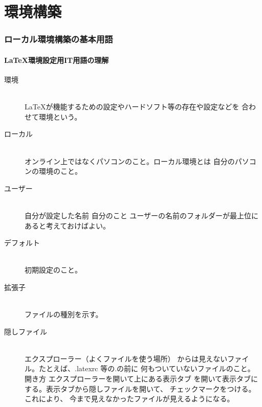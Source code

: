 \documentclass{ltjsarticle}
\begin{document}
\part{環境構築}
\section{ローカル環境構築の基本用語}
\subsection{\LaTeX 環境設定用IT用語の理解}

\begin{description}
  \item [環境] ~\\
    \LaTeX が機能するための設定やハードソフト等の存在や設定などを
    合わせて環境という。
  \item [ローカル] ~\\
    オンライン上ではなくパソコンのこと。ローカル環境とは
    自分のパソコンの環境のこと。
  \item [ユーザー] ~\\
    自分が設定した名前 自分のこと
    ユーザーの名前のフォルダーが最上位にあると考えておけばよい。


  \item [デフォルト] ~\\
    初期設定のこと。
  \item[拡張子] ~\\
    ファイルの種別を示す。
  \item [隠しファイル] ~\\
    エクスプローラー（よくファイルを使う場所）
    からは見えないファイル。たとえば、.latexrc 等の.の前に
    何もついていないファイルのこと。
    開き方 エクスプローラーを開いて上にある表示タブ
    を開いて表示タブにする。表示タブから隠しファイルを開いて、
    チェックマークをつける。これにより、
    今まで見えなかったファイルが見えるようになる。


\end{description}
\end{document}
